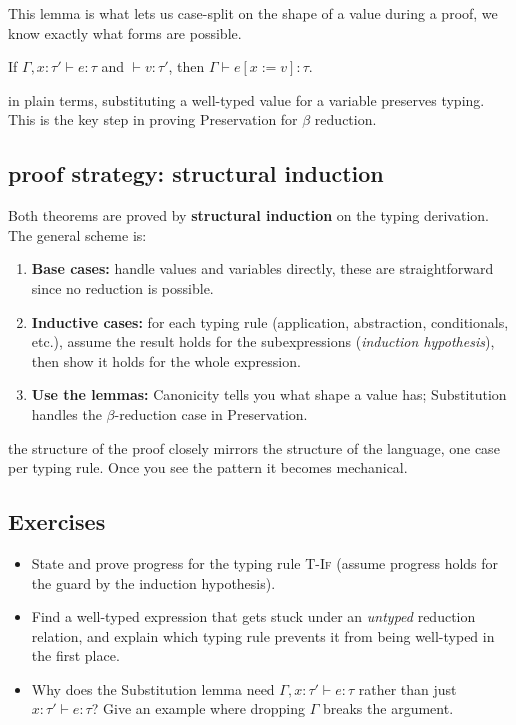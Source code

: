 This lemma is what lets us case-split on the shape of a value during a proof, we know exactly what forms are possible.

\begin{lemma}[Substitution]
If $\Gamma, x : \tau' \vdash e : \tau$ and $\vdash v : \tau'$, then
$\Gamma \vdash e[x := v] : \tau$.
\end{lemma}

in plain terms, substituting a well-typed value for a variable preserves typing. This is the key step in proving Preservation for $\beta$ reduction.

\subsection{proof strategy: structural induction}
Both theorems are proved by \textbf{structural induction} on the typing derivation. The general scheme is:

\begin{enumerate}
    \item \textbf{Base cases:} handle values and variables directly, these are straightforward since no reduction is possible.
    \item \textbf{Inductive cases:} for each typing rule (application,
    abstraction, conditionals, etc.), assume the result holds for the
    subexpressions (\emph{induction hypothesis}), then show it holds for
    the whole expression.
    \item \textbf{Use the lemmas:} Canonicity tells you what shape a
    value has; Substitution handles the $\beta$-reduction case in
    Preservation.
\end{enumerate}

the structure of the proof closely mirrors the structure of the language, one case per typing rule. Once you see the pattern it becomes mechanical.

\subsection{Exercises}
\begin{itemize}
  \item State and prove progress for the typing rule \textsc{T-If}
  (assume progress holds for the guard by the induction hypothesis).
  \item Find a well-typed expression that gets stuck under an
  \emph{untyped} reduction relation, and explain which typing rule
  prevents it from being well-typed in the first place.
  \item Why does the Substitution lemma need $\Gamma, x:\tau' \vdash e :
  \tau$ rather than just $x:\tau' \vdash e : \tau$? Give an example where
  dropping $\Gamma$ breaks the argument.
\end{itemize}
